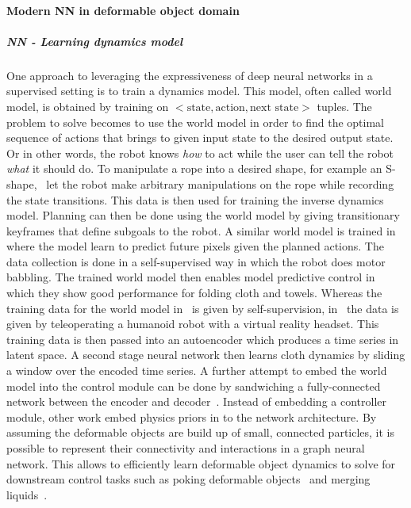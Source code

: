 \documentclass[\home/main.tex]{subfiles}
\begin{document}
\paragraph{Modern NN in deformable object domain}

\subparagraph{NN - Learning dynamics model}
One approach to leveraging the expressiveness of deep neural networks in a supervised setting is to train a dynamics model. This  model, often called world model, is obtained by training on $<\text{state}, \text{action}, \text{next state}>$ tuples. The  problem to solve becomes to use the world model in order to find the optimal sequence of actions that brings to given input state to the desired output state. Or in other words, the robot knows \textit{how} to act while the user can tell the robot \textit{what} it should do. To manipulate a rope into a desired shape, for example an S-shape,~\autocite{Nair2017} let the robot make arbitrary manipulations on the rope while recording the state transitions. This data is then used for training the inverse dynamics model. Planning can then be done using the world model by giving transitionary keyframes that define subgoals to the robot. A similar world model is trained in~\autocite{Ebert2018} where the model learn to predict future pixels given the planned actions. The data collection is done in a self-supervised way in which the robot does motor babbling. The trained world model then enables model predictive control in which they show good performance for folding cloth and towels. Whereas the training data for the world model in~\autocite{Nair2017} is given by self-supervision, in~\autocite{Yang2016} the data is given by teleoperating a humanoid robot with a virtual reality headset. This training data is then passed into an autoencoder which produces a time series in latent space. A second stage neural network then learns cloth dynamics by sliding a window over the encoded time series. A further attempt to embed the world model into the control module can be done by sandwiching a fully-connected network between the encoder and decoder~\autocite{Tanaka2018}. Instead of embedding a controller module, other work embed physics priors in to the network architecture. By assuming the deformable objects are build up of small, connected particles, it is possible to represent their connectivity and interactions in a graph neural network. This allows to efficiently learn deformable object dynamics to solve for downstream control tasks such as poking deformable objects~\autocite{Mrowca2018} and merging liquids~\autocite{Li2018}.
\end{document}

